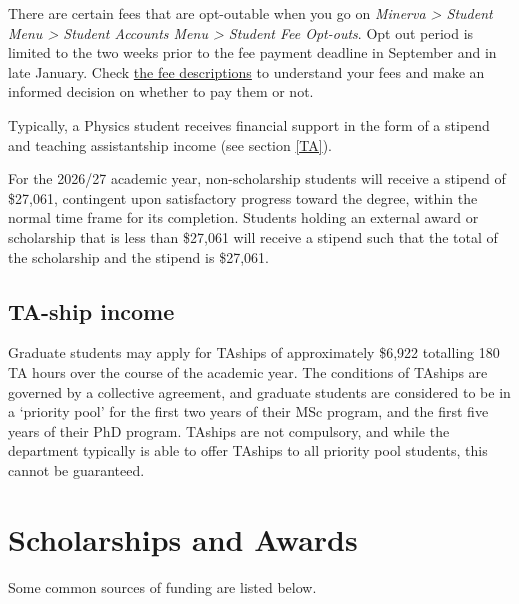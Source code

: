 There are certain fees that are opt-outable when you go on \textit{Minerva > Student Menu > Student Accounts Menu > Student Fee Opt-outs}. Opt out period is limited to the two weeks prior to the fee payment deadline in September and in late January. Check \href{https://www.mcgill.ca/student-accounts/tuition-fees/fee-descriptions}{the fee descriptions} to understand your fees and make an informed decision on whether to pay them or not.

Typically, a Physics student receives financial support in the form of a stipend and teaching assistantship income (see section \hyperref[TA]{\textcolor{purble}{\ref*{TA}}}).

For the 2026/27 academic year, non-scholarship students will receive a stipend of {\color{ocre}\$27,061}, contingent upon satisfactory progress toward the degree, within the normal time frame for its completion. Students holding an external award or scholarship that is less than \$27,061 will receive a stipend such that the total of the scholarship and the stipend is \$27,061.

\subsection*{TA-ship income} 

Graduate students may apply for TAships of approximately \$6,922 totalling 180 TA hours over the course of the academic year. The conditions of TAships are governed by a collective agreement, and graduate students are considered to be in a ‘priority pool’ for the first two years of their MSc program, and the first five years of their PhD program. TAships are not compulsory, and while the department typically is able to offer TAships to all priority pool students, this cannot be guaranteed.
    

\section{Scholarships and Awards} \label{section:scholarships}
Some common sources of funding are listed below.

